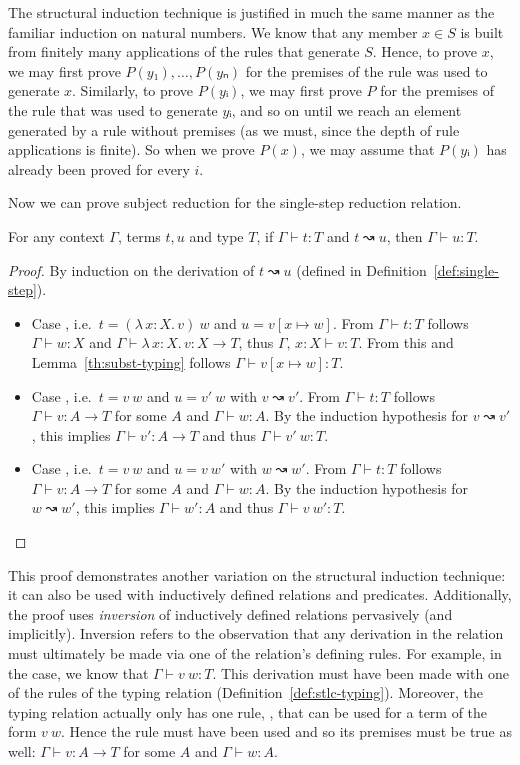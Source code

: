 \documentclass{scrartcl}
\theoremstyle{definition}
\newcommand{\Lam}[2]{λ\,#1.\, #2}
\newcommand{\lbl}[1]{\RightTirNameStyle{#1}}
\begin{document}
The structural induction technique is justified in much the same manner as the familiar induction on natural numbers.
We know that any member $x ∈ S$ is built from finitely many applications of the rules that generate $S$.
Hence, to prove $x$, we may first prove $P(y₁), \dots, P(yₙ)$ for the premises of the rule was used to generate $x$.
Similarly, to prove $P(yᵢ)$, we may first prove $P$ for the premises of the rule that was used to generate $yᵢ$, and so on until we reach an element generated by a rule without premises (as we must, since the depth of rule applications is finite).
So when we prove $P(x)$, we may assume that $P(yᵢ)$ has already been proved for every $i$.

Now we can prove subject reduction for the single-step reduction relation.

\begin{lemma}\label{lem:subject-reduction-single}
  For any context $Γ$, terms $t,u$ and type $T$, if $Γ ⊢ t : T$ and $t ↝ u$, then $Γ ⊢ u : T$.
\end{lemma}

\begin{proof}
  By induction on the derivation of $t ↝ u$ (defined in Definition~\ref{def:single-step}).
  \begin{itemize}
    \item Case \lbl{β}, i.e.\ $t = (\Lam{x : X}{v})~w$ and $u = v[x ↦ w]$.
          From $Γ ⊢ t : T$ follows $Γ ⊢ w : X$ and $Γ ⊢ \Lam{x : X}{v} : X → T$, thus $Γ,\, x : X ⊢ v : T$.
          From this and Lemma~\ref{th:subst-typing} follows $Γ ⊢ v[x ↦ w] : T$.
    \item Case \lbl{CongAppL}, i.e.\ $t = v~w$ and $u = v'~w$ with $v ↝ v'$.
          From $Γ ⊢ t : T$ follows $Γ ⊢ v : A → T$ for some $A$ and $Γ ⊢ w : A$.
          By the induction hypothesis for $v ↝ v'$, this implies $Γ ⊢ v' : A → T$ and thus $Γ ⊢ v'~w : T$.
    \item Case \lbl{CongAppR}, i.e.\ $t = v~w$ and $u = v~w'$ with $w ↝ w'$.
          From $Γ ⊢ t : T$ follows $Γ ⊢ v : A → T$ for some $A$ and $Γ ⊢ w : A$.
          By the induction hypothesis for $w ↝ w'$, this implies $Γ ⊢ w' : A$ and thus $Γ ⊢ v~w' : T$.
  \end{itemize}
\end{proof}

This proof demonstrates another variation on the structural induction technique: it can also be used with inductively defined relations and predicates.
Additionally, the proof uses \emph{inversion} of inductively defined relations pervasively (and implicitly).
Inversion refers to the observation that any derivation in the relation must ultimately be made via one of the relation's defining rules.
For example, in the \lbl{CongAppL} case, we know that $Γ ⊢ v~w : T$.
This derivation must have been made with one of the rules of the typing relation (Definition~\ref{def:stlc-typing}).
Moreover, the typing relation actually only has one rule, \lbl{App}, that can be used for a term of the form $v~w$.
Hence the \lbl{App} rule must have been used and so its premises must be true as well: $Γ ⊢ v : A → T$ for some $A$ and $Γ ⊢ w : A$.
\end{document}
